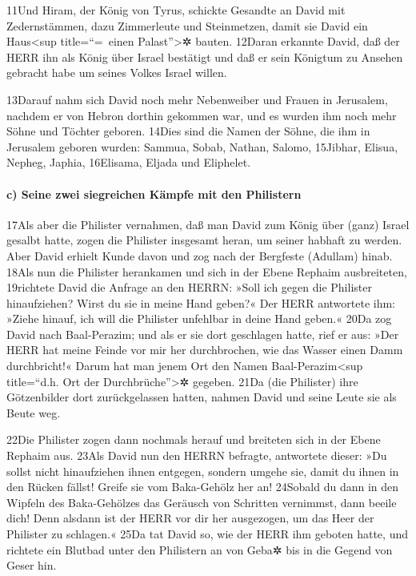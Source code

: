 11Und Hiram, der König von Tyrus, schickte Gesandte an David mit
Zedernstämmen, dazu Zimmerleute und Steinmetzen, damit sie David ein
Haus\textless sup title=``=~einen Palast''\textgreater✲ bauten. 12Daran
erkannte David, daß der HERR ihn als König über Israel bestätigt und daß
er sein Königtum zu Ansehen gebracht habe um seines Volkes Israel
willen.

13Darauf nahm sich David noch mehr Nebenweiber und Frauen in Jerusalem,
nachdem er von Hebron dorthin gekommen war, und es wurden ihm noch mehr
Söhne und Töchter geboren. 14Dies sind die Namen der Söhne, die ihm in
Jerusalem geboren wurden: Sammua, Sobab, Nathan, Salomo, 15Jibhar,
Elisua, Nepheg, Japhia, 16Elisama, Eljada und Eliphelet.

\hypertarget{c-seine-zwei-siegreichen-kuxe4mpfe-mit-den-philistern}{%
\paragraph{c) Seine zwei siegreichen Kämpfe mit den
Philistern}\label{c-seine-zwei-siegreichen-kuxe4mpfe-mit-den-philistern}}

17Als aber die Philister vernahmen, daß man David zum König über (ganz)
Israel gesalbt hatte, zogen die Philister insgesamt heran, um seiner
habhaft zu werden. Aber David erhielt Kunde davon und zog nach der
Bergfeste (Adullam) hinab. 18Als nun die Philister herankamen und sich
in der Ebene Rephaim ausbreiteten, 19richtete David die Anfrage an den
HERRN: »Soll ich gegen die Philister hinaufziehen? Wirst du sie in meine
Hand geben?« Der HERR antwortete ihm: »Ziehe hinauf, ich will die
Philister unfehlbar in deine Hand geben.« 20Da zog David nach
Baal-Perazim; und als er sie dort geschlagen hatte, rief er aus: »Der
HERR hat meine Feinde vor mir her durchbrochen, wie das Wasser einen
Damm durchbricht!« Darum hat man jenem Ort den Namen
Baal-Perazim\textless sup title=``d.h. Ort der
Durchbrüche''\textgreater✲ gegeben. 21Da (die Philister) ihre
Götzenbilder dort zurückgelassen hatten, nahmen David und seine Leute
sie als Beute weg.

22Die Philister zogen dann nochmals herauf und breiteten sich in der
Ebene Rephaim aus. 23Als David nun den HERRN befragte, antwortete
dieser: »Du sollst nicht hinaufziehen ihnen entgegen, sondern umgehe
sie, damit du ihnen in den Rücken fällst! Greife sie vom Baka-Gehölz her
an! 24Sobald du dann in den Wipfeln des Baka-Gehölzes das Geräusch von
Schritten vernimmst, dann beeile dich! Denn alsdann ist der HERR vor dir
her ausgezogen, um das Heer der Philister zu schlagen.« 25Da tat David
so, wie der HERR ihm geboten hatte, und richtete ein Blutbad unter den
Philistern an von Geba✲ bis in die Gegend von Geser hin.

